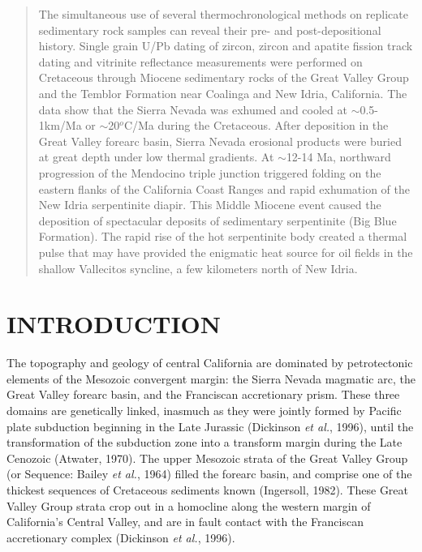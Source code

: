 \documentclass[11pt,twoside]{article}
\begin{document}
\begin{abstract}
The  simultaneous  use   of  several  thermochronological  methods  on
replicate  sedimentary   rock  samples  can  reveal   their  pre-  and
post-depositional history.  Single grain U/Pb dating of zircon, zircon
and   apatite   fission  track   dating   and  vitrinite   reflectance
measurements were performed  on Cretaceous through Miocene sedimentary
rocks  of  the Great  Valley  Group  and  the Temblor  Formation  near
Coalinga and  New Idria,  California.  The data  show that  the Sierra
Nevada was exhumed and  cooled at $\sim$0.5-1km/Ma or $\sim$20$^o$C/Ma
during the  Cretaceous.  After deposition in the  Great Valley forearc
basin,  Sierra Nevada erosional  products were  buried at  great depth
under low thermal gradients.  At $\sim$12-14 Ma, northward progression
of  the Mendocino  triple junction  triggered folding  on  the eastern
flanks of the California Coast  Ranges and rapid exhumation of the New
Idria  serpentinite  diapir.  This  Middle   Miocene  event caused  the
deposition  of spectacular deposits  of sedimentary  serpentinite (Big
Blue Formation).  The rapid rise  of the hot serpentinite body created
a thermal pulse  that may have provided the  enigmatic heat source for
oil fields in the shallow  Vallecitos syncline, a few kilometers north
of New Idria.
\end{abstract}

\section*{\uppercase{Introduction}}
\label{sec:introduction}

The  topography and  geology of  central California  are  dominated by
petrotectonic elements  of the Mesozoic convergent  margin: the Sierra
Nevada  magmatic  arc,  the   Great  Valley  forearc  basin,  and  the
Franciscan  accretionary prism.  These  three domains  are genetically
linked,  inasmuch  as  they  were  jointly  formed  by  Pacific  plate
subduction  beginning in the  Late Jurassic  (Dickinson {\it  et al.},
1996),  until  the  transformation  of  the  subduction  zone  into  a
transform margin during the  Late Cenozoic (Atwater, 1970).  The upper
Mesozoic strata of the Great Valley Group (or Sequence: Bailey {\it et
al.}, 1964) filled the forearc basin, and comprise one of the thickest
sequences  of  Cretaceous sediments  known  (Ingersoll, 1982).   These
Great Valley  Group strata crop out  in a homocline  along the western
margin of California's  Central Valley, and are in  fault contact with
the Franciscan accretionary complex (Dickinson {\it et al.}, 1996).\\
\end{document}
